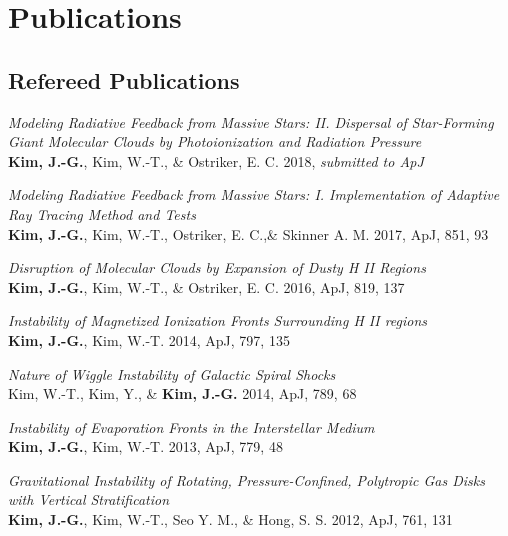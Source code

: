 \section{Publications}

\subsection{Refereed Publications
  \href{http://adsabs.harvard.edu/cgi-bin/nph-abs_connect?library&libname=Jeong-Gyu+Kim&libid=4b3ebd59ff}{\color{dodgerblue}{(ADS Link)}}}

\begin{benumerate}{7}
\item \textit{Modeling Radiative Feedback from Massive Stars: II.
    Dispersal of Star-Forming Giant Molecular Clouds by
    Photoionization and Radiation Pressure} \\
  \textbf{Kim, J.-G.}, Kim, W.-T., \& Ostriker, E. C. 2018,
  \textit{submitted to ApJ}
\item \textit{Modeling Radiative Feedback from Massive Stars: I.
  Implementation of Adaptive Ray Tracing Method and Tests}\\
\textbf{Kim, J.-G.}, Kim, W.-T., Ostriker, E. C.,\& Skinner A. M.
2017, ApJ, 851, 93
\item \textit{Disruption of Molecular Clouds by Expansion of Dusty H II
  Regions}\\
\textbf{Kim, J.-G.}, Kim, W.-T., \& Ostriker, E. C. 2016, ApJ, 819,
137
\item \textit{Instability of Magnetized Ionization Fronts
  Surrounding H II regions}\\
\textbf{Kim, J.-G.}, Kim, W.-T. 2014, ApJ, 797, 135
\item \textit{Nature of Wiggle Instability of Galactic Spiral
  Shocks}\\
Kim, W.-T., Kim, Y., \& \textbf{Kim, J.-G.} 2014, ApJ, 789, 68
\item \textit{Instability of Evaporation Fronts in the
  Interstellar Medium}\\
\textbf{Kim, J.-G.}, Kim, W.-T. 2013, ApJ, 779, 48
\item \textit{Gravitational Instability of Rotating,
    Pressure-Confined,
    Polytropic Gas Disks with Vertical Stratification} \\
  \textbf{Kim, J.-G.}, Kim, W.-T., Seo Y. M., \& Hong, S. S. 2012,
  ApJ, 761, 131
\end{benumerate}

